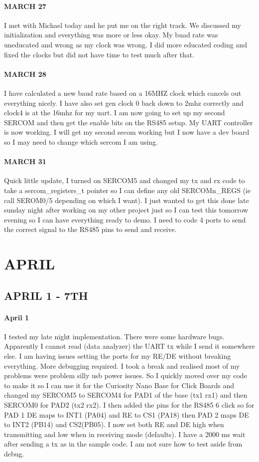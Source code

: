 \documentclass{article}
\begin{document}
\paragraph{MARCH 27} I met with Michael today and he put me on the right track. We discussed my initialization and everything was more or less okay. My buad rate was uneducated and wrong as my clock was wrong. I did more educated coding and fixed the clocks but did not have time to test much after that. 
\paragraph{MARCH 28} I have calculated a new baud rate based on a 16MHZ clock which cancels out everything nicely. I have also set gen clock 0 back down to 2mhz correctly and clock4 is at the 16mhz for my uart. I am now going to set up my second SERCOM and then get the enable bits on the RS485 setup. My UART controller is now working. I will get my second secom working but I now have a dev board so I may need to change which sercom I am using. 
\paragraph{MARCH 31} Quick little update, I turned on SERCOM5 and changed my tx and rx code to take a sercom\_registers\_t pointer so I can define any old SERCOMn\_REGS (ie call SEROM0/5 depending on which I want). I just wanted to get this done late sunday night after working on my other project just so I can test this tomorrow evening so I can have everything ready to demo. I need to code 4 ports to send the correct signal to the RS485 pins to send and receive.  
\section{APRIL}
\subsection{APRIL 1 - 7TH}
\paragraph{April 1} I tested my late night implementation. There were some hardware bugs. Apparently I cannot read (data analyzer) the UART tx while I send it somewhere else. I am having issues setting the ports for my RE/DE without breaking everything. More debugging required. I took a break and realised most of my problems were problem silly usb power issues. So I quickly moved over my code to make it so I can use it for the Curiosity Nano Base for Click Boards and changed my SERCOM5 to SERCOM4 for PAD1 of the base (tx1 rx1) and then SERCOM0 for PAD2 (tx2 rx2). I then added the pins for the RS485 6 click so for PAD 1 DE maps to INT1 (PA04) and RE to CS1 (PA18) then PAD 2 maps DE to INT2 (PB14) and CS2(PB05). I now set both RE and DE high when transmitting and low when in receiving mode (defaults). I have a 2000 ms wait after sending a tx as in the sample code. I am not sure how to test aside from debug. 
\end{document}
